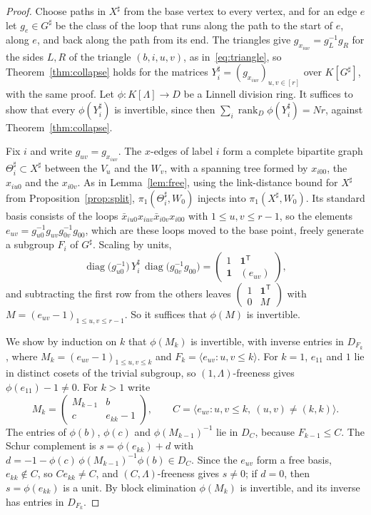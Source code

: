 \documentclass[11pt]{article}
\theoremstyle{definition}
\theoremstyle{remark}
\numberwithin{equation}{section}
\DeclareMathOperator{\rank}{rank}
\begin{document}
\begin{proof}
Choose paths in $X^\sharp$ from the base vertex to every vertex, and for an edge $e$ let $g_e\in G^\sharp$ be the class of the loop that runs along the path to the start of $e$, along $e$, and back along the path from its end. The triangles give $g_{x_{iuv}}=g_L^{-1}g_R$ for the sides $L,R$ of the triangle $(b,i,u,v)$, as in~\eqref{eq:triangle}, so Theorem~\ref{thm:collapse} holds for the matrices $Y_i^\sharp=(g_{x_{iuv}})_{u,v\in[r]}$ over $K[G^\sharp]$, with the same proof. Let $\phi\colon K[\Lambda]\to D$ be a Linnell division ring. It suffices to show that every $\phi(Y_i^\sharp)$ is invertible, since then $\sum_i\rank_D\phi(Y_i^\sharp)=Nr$, against Theorem~\ref{thm:collapse}.

Fix $i$ and write $g_{uv}=g_{x_{iuv}}$. The $x$-edges of label $i$ form a complete bipartite graph $\Theta_i^\sharp\subset X^\sharp$ between the $V_u$ and the $W_v$, with a spanning tree formed by $x_{i00}$, the $x_{iu0}$ and the $x_{i0v}$. As in Lemma~\ref{lem:free}, using the link-distance bound for $X^\sharp$ from Proposition~\ref{prop:split}, $\pi_1(\Theta_i^\sharp,W_0)$ injects into $\pi_1(X^\sharp,W_0)$. Its standard basis consists of the loops $\bar x_{iu0}x_{iuv}\bar x_{i0v}x_{i00}$ with $1\le u,v\le r-1$, so the elements $e_{uv}=g_{u0}^{-1}g_{uv}g_{0v}^{-1}g_{00}$, which are these loops moved to the base point, freely generate a subgroup $F_i$ of $G^\sharp$. Scaling by units,
\[
 \operatorname{diag}\bigl(g_{u0}^{-1}\bigr)\,Y_i^\sharp\,\operatorname{diag}\bigl(g_{0v}^{-1}g_{00}\bigr)=\begin{pmatrix}1&\mathbf 1^{\mathsf T}\\ \mathbf 1&(e_{uv})\end{pmatrix},
\]
and subtracting the first row from the others leaves $\left(\begin{smallmatrix}1&\mathbf 1^{\mathsf T}\\0&M\end{smallmatrix}\right)$ with $M=(e_{uv}-1)_{1\le u,v\le r-1}$. So it suffices that $\phi(M)$ is invertible.

We show by induction on $k$ that $\phi(M_k)$ is invertible, with inverse entries in $D_{F_k}$, where $M_k=(e_{uv}-1)_{1\le u,v\le k}$ and $F_k=\langle e_{uv}:u,v\le k\rangle$. For $k=1$, $e_{11}$ and $1$ lie in distinct cosets of the trivial subgroup, so $(1,\Lambda)$-freeness gives $\phi(e_{11})-1\ne0$. For $k>1$ write
\[
 M_k=\begin{pmatrix}M_{k-1}&b\\c&e_{kk}-1\end{pmatrix},\qquad C=\bigl\langle e_{uv}:u,v\le k,\ (u,v)\ne(k,k)\bigr\rangle.
\]
The entries of $\phi(b)$, $\phi(c)$ and $\phi(M_{k-1})^{-1}$ lie in $D_C$, because $F_{k-1}\le C$. The Schur complement is $s=\phi(e_{kk})+d$ with $d=-1-\phi(c)\,\phi(M_{k-1})^{-1}\phi(b)\in D_C$. Since the $e_{uv}$ form a free basis, $e_{kk}\notin C$, so $Ce_{kk}\ne C$, and $(C,\Lambda)$-freeness gives $s\ne0$; if $d=0$, then $s=\phi(e_{kk})$ is a unit. By block elimination $\phi(M_k)$ is invertible, and its inverse has entries in $D_{F_k}$.
\end{proof}
\end{document}
